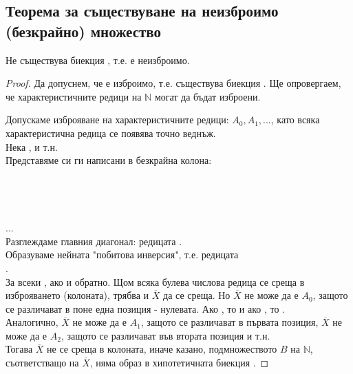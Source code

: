 \subsection{Теорема за съществуване на неизброимо (безкрайно) множество}
\begin{theorem}
    Не съществува биекция , т.е.  е неизброимо.
\end{theorem}
\begin{proof}
    Да допуснем, че  е изброимо, т.е. съществува биекция 
    .
    Ще опровергаем, че характеристичните редици на \(\mathbb{N}\) могат да бъдат изброени.

    Допускаме изброяване на характеристичните редици: \(A_0, A_1, ...\), като всяка характеристична 
    редица се появява точно веднъж. \\
    Нека ,  и т.н. \\
    Представяме си ги написани в безкрайна колона: \\
     \\
     \\
     \\
     \\
    ... \\
    Разглеждаме главния диагонал: редицата . \\
    Образуваме нейната "побитова инверсия", т.е. редицата \\
    . \\
    За всеки , ако  и обратно.
    Щом всяка булева числова редица се среща в изброяването (колоната), трябва и \(\overline{X}\) да 
    се среща. Но \(\overline{X}\) не може да е \(A_0\), защото се различават в поне една позиция - нулевата.
    Ако , то  и ако , 
    то . \\
    Аналогично, \(\overline{X}\) не може да е \(A_1\), защото се различават в първата позиция, 
    \(\overline{X}\) не може да е \(A_2\), защото се различават във втората позиция и т.н. \\
    Тогава \(\overline{X}\) не се среща в колоната, иначе казано, подмножеството \(B\) на \(\mathbb{N}\),
    съответстващо на \(\overline{X}\), няма образ в хипотетичната биекция .
\end{proof}

